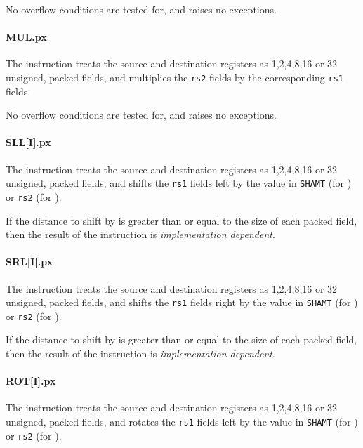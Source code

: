 No overflow conditions are tested for, and  raises no exceptions.

\paragraph{MUL.px}

The instruction  treats the source and destination registers as
1,2,4,8,16 or 32 unsigned, packed fields, and multiplies the {\tt rs2} fields
by the corresponding {\tt rs1} fields.

No overflow conditions are tested for, and  raises no exceptions.

\paragraph{SLL[I].px}

The instruction  treats the source and destination registers as
1,2,4,8,16 or 32 unsigned, packed fields, and shifts the {\tt rs1} fields
left by the value in {\tt SHAMT} (for ) or {\tt rs2} 
(for ).

If the distance to shift by is greater than or equal to the size of each
packed field, then the result of the  instruction is
{\em implementation dependent}.

\paragraph{SRL[I].px}

The instruction  treats the source and destination registers as
1,2,4,8,16 or 32 unsigned, packed fields, and shifts the {\tt rs1} fields
right by the value in {\tt SHAMT} (for ) or {\tt rs2} 
(for ).

If the distance to shift by is greater than or equal to the size of each
packed field, then the result of the  instruction is
{\em implementation dependent}.

\paragraph{ROT[I].px}

The instruction  treats the source and destination registers as
1,2,4,8,16 or 32 unsigned, packed fields, and rotates the {\tt rs1} fields
left by the value in {\tt SHAMT} (for ) or {\tt rs2} 
(for ).

